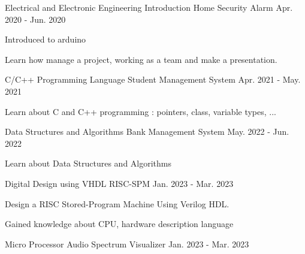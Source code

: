 \begin{cventries}
    \cventry
    {Electrical and Electronic Engineering Introduction}
    {Home Security Alarm}
    {}
    {Apr. 2020 - Jun. 2020}
    {
    \begin{cvitems}
        \item {Introduced to arduino}
        \item {Learn how manage a project, working as a team and make a presentation.}
    \end{cvitems}
    }
\end{cventries}

\begin{cventries}
    \cventry
    {C/C++ Programming Language}
    {Student Management System}
    {}
    {Apr. 2021 - May. 2021}
    {
    \begin{cvitems}
        \item {Learn about C and C++ programming : pointers, class,
        variable types, ...}
    \end{cvitems}
    }
\end{cventries}

\begin{cventries}
    \cventry
    {Data Structures and Algorithms}
    {Bank Management System}
    {}
    {May. 2022 - Jun. 2022}
    {
    \begin{cvitems}
        \item {Learn about Data Structures and Algorithms}
    \end{cvitems}
    }
\end{cventries}

\begin{cventries}
    \cventry
    {Digital Design using VHDL}
    {RISC-SPM}
    {}
    {Jan. 2023 - Mar. 2023}
    {
    \begin{cvitems}
        \item {Design a RISC Stored-Program Machine Using Verilog HDL.}
        \item {Gained knowledge about CPU, hardware description language}
    \end{cvitems}
    }
\end{cventries}

\begin{cventries}
    \cventry
    {Micro Processor}
    {Audio Spectrum Visualizer}
    {}
    {Jan. 2023 - Mar. 2023}
    {}
\end{cventries}